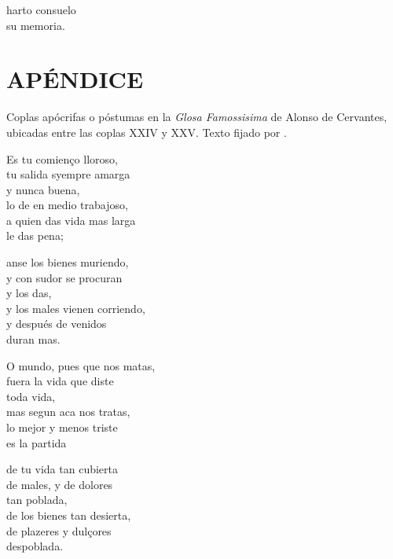 \documentclass[11pt,a4paper,twoside]{article}
\begin{document}
 harto consuelo\\ 
su memoria.\par
\pend
\endnumbering
\vfill
\relax
\newpage

\section*{\centering\fontsize{11}{14}\selectfont APÉNDICE}

Coplas apócrifas o póstumas en la \emph{Glosa Famossisima} de Alonso de Cervantes, ubicadas entre las coplas XXIV y XXV. Texto fijado por \textcite{Foulché-Delbosc1902}.\vspace{5pt}

\begin{pairs}
	\begin{Leftside}
		\beginnumbering
		\pstart
		Es tu comienço lloroso,\\
		tu salida syempre amarga\\
		y nunca buena,\\
		lo de en medio trabajoso,\\
		a quien das vida mas larga\\
		le das pena;\par
		anse los bienes muriendo,\\
		y con sudor se procuran\\
		y los das,\\
		y los males vienen corriendo,\\
		y después de venidos\\
		duran mas.\par
		\pend
		\endnumbering
	\end{Leftside}
	\begin{Rightside}
		\beginnumbering
		\pstart
		O mundo, pues que nos matas,\\
		fuera la vida que diste\\
		toda vida,\\
		mas segun aca nos tratas,\\
		lo mejor y menos triste\\
		es la partida\par
		de tu vida tan cubierta\\
		de males, y de dolores\\
		tan poblada,\\
		de los bienes tan desierta,\\
		de plazeres y dulçores\\
		despoblada.\par
		\pend
		\endnumbering
	\end{Rightside}
\end{pairs}
	\Columns
\end{document}

